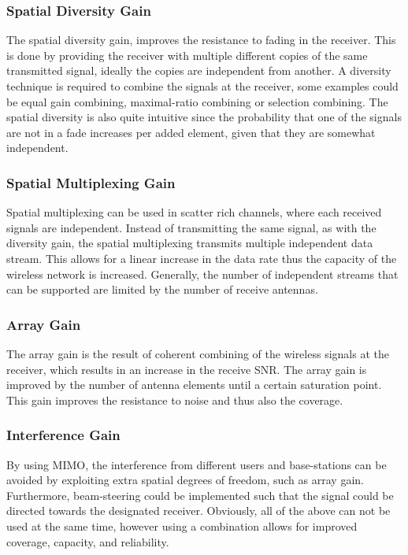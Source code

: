 \subsubsection{Spatial Diversity Gain}
The spatial diversity gain, improves the resistance to fading in the receiver. This is done by providing the receiver with multiple different copies of the same transmitted signal, ideally the copies are independent from another. A diversity technique is required to combine the signals at the receiver\cite{Ezio2007MIMO}, some examples could be equal gain combining, maximal-ratio combining or selection combining. The spatial diversity is also quite intuitive since the probability that one of the signals are not in a fade increases per added element, given that they are somewhat independent. 
 
\subsubsection{Spatial Multiplexing Gain}
Spatial multiplexing can be used in scatter rich channels, where each received signals are independent. Instead of transmitting the same signal, as with the diversity gain, the spatial multiplexing transmits multiple independent data stream. This allows for a linear increase in the data rate thus the capacity of the wireless network is increased. Generally, the number of independent streams that can be supported are limited by the number of receive antennas. \cite{Tim2012Practical}

\subsubsection{Array Gain}
The array gain is the result of coherent combining of the wireless signals at the receiver, which results in an increase in the receive SNR. The array gain is improved by the number of antenna elements until a certain saturation point. This gain improves the resistance to noise and thus also the coverage. \cite{Tim2012Practical} 
  
\subsubsection{Interference Gain}
By using MIMO, the interference from different users and base-stations can be avoided by exploiting extra spatial degrees of freedom, such as array gain. Furthermore, beam-steering could be implemented such that the signal could be directed towards the designated receiver. Obviously, all of the above can not be used at the same time, however using a combination  allows for improved coverage, capacity, and reliability. \cite{Tim2012Practical} 

